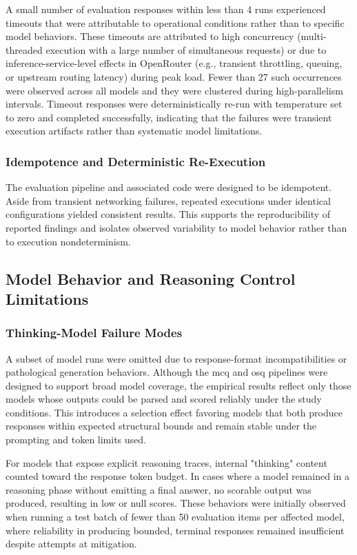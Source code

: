 A small number of evaluation responses within less than 4 runs experienced timeouts that were attributable to operational conditions rather than to specific model behaviors. These timeouts are attributed to high concurrency (multi-threaded execution with a large number of simultaneous requests) or due to inference-service-level effects in OpenRouter (e.g., transient throttling, queuing, or upstream routing latency) during peak load. Fewer than 27 such occurrences were observed across all models and they were clustered during high-parallelism intervals. Timeout responses were deterministically re-run with temperature set to zero and completed successfully, indicating that the failures were transient execution artifacts rather than systematic model limitations.

\subsubsection{Idempotence and Deterministic Re-Execution}

The evaluation pipeline and associated code were designed to be idempotent. Aside from transient networking failures, repeated executions under identical configurations yielded consistent results. This supports the reproducibility of reported findings and isolates observed variability to model behavior rather than to execution nondeterminism.

\subsection{Model Behavior and Reasoning Control Limitations}

\subsubsection{Thinking-Model Failure Modes}

A subset of model runs were omitted due to response-format incompatibilities or pathological generation behaviors. Although the \ac{mcq} and \ac{osq} pipelines were designed to support broad model coverage, the empirical results reflect only those models whose outputs could be parsed and scored reliably under the study conditions. This introduces a selection effect favoring models that both produce responses within expected structural bounds and remain stable under the prompting and token limits used.

For models that expose explicit reasoning traces, internal "thinking" content counted toward the response token budget. In cases where a model remained in a reasoning phase without emitting a final answer, no scorable output was produced, resulting in low or null scores. These behaviors were initially observed when running a test batch of fewer than 50 evaluation items per affected model, where reliability in producing bounded, terminal responses remained insufficient despite attempts at mitigation.

